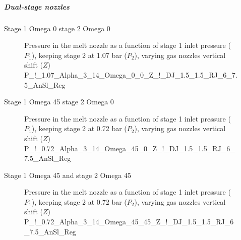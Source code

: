 \documentclass[../../../main.tex]{subfiles}
\begin{document}
\subparagraph{Dual-stage nozzles}

Stage 1 Omega 0 stage 2 Omega 0

\vspace{0mm}
\begin{figure}[H]
    \centering
        
        \caption{Pressure in the melt nozzle as a function of stage 1 inlet pressure ($P_1$), keeping stage 2 at 1.07 bar ($P_2$), varying gas nozzles vertical shift ($Z$) P\_!\_1.07\_Alpha\_3\_14\_Omega\_0\_0\_Z\_!\_DJ\_1.5\_1.5\_RJ\_6\_7.5\_AnSl\_Reg}
        \label{f:dual_stage_Omega_0_0}
\end{figure}
\FloatBarrier
\vspace{0mm}

Stage 1 Omega 45 stage 2 Omega 0

\vspace{0mm}
\begin{figure}[H]
    \centering
        
        \caption{Pressure in the melt nozzle as a function of stage 1 inlet pressure ($P_1$), keeping stage 2 at 0.72 bar ($P_2$), varying gas nozzles vertical shift ($Z$) P\_!\_0.72\_Alpha\_3\_14\_Omega\_45\_0\_Z\_!\_DJ\_1.5\_1.5\_RJ\_6\_7.5\_AnSl\_Reg}
        \label{f:dual_stage_Omega_45_0}
\end{figure}
\FloatBarrier
\vspace{0mm}

Stage 1 Omega 45 and stage 2 Omega 45

\vspace{0mm}
\begin{figure}[H]
    \centering
        
        \caption{Pressure in the melt nozzle as a function of stage 1 inlet pressure ($P_1$), keeping stage 2 at 0.72 bar ($P_2$), varying gas nozzles vertical shift ($Z$) P\_!\_0.72\_Alpha\_3\_14\_Omega\_45\_45\_Z\_!\_DJ\_1.5\_1.5\_RJ\_6\_7.5\_AnSl\_Reg}
        \label{f:dual_stage_Omega_45_45}
\end{figure}
\FloatBarrier
\vspace{0mm}
\end{document}

